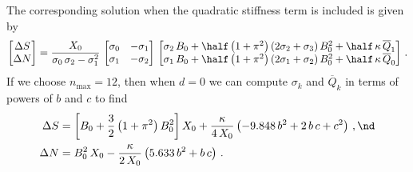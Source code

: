 The corresponding solution when the quadratic stiffness term is included is given by
\begin{equation}\label{eqn:rms_sol_quad}
\begin{bmatrix}
  \Delta S \\
  \Delta N
\end{bmatrix} = \frac{X_0}{\sigma_0\, \sigma_2 - \sigma_1^2}\,
\begin{bmatrix}
  \sigma_0 & -\sigma_1 \\
  \sigma_1 & -\sigma_2
\end{bmatrix}\,
\begin{bmatrix}
  \sigma_2\, B_0 + \half \left(1 + \pi^2\right) \left(2 \sigma_2 + \sigma_3\right) B_0^2 + \half\, \kappa\, \overline{Q}_1 \\
  \sigma_1\, B_0 + \half \left(1 + \pi^2\right) \left(2 \sigma_1 + \sigma_2\right) B_0^2 + \half\, \kappa\, \overline{Q}_0
\end{bmatrix}\, .
 \end{equation}
If we choose $n_\text{max} = 12$, then when $d = 0$ we can compute $\sigma_k$ and $\overline{Q}_k$ in terms of powers of $b$ and $c$ to find
\begin{align} \label{eqn:rms_sol_comp}
  \Delta S &= \left[ B_0 + \frac{3}{2} \left(1 + \pi^2\right) B_0^2 \right] X_0 + \frac{\kappa}{4\, X_0} \left( -9.848\, b^2 + 2\, b\, c + c^2 \right)\, , \nd \\
  \Delta N &= B_0^2\, X_0 - \frac{\kappa}{2\, X_0} \left( 5.633\, b^2 + b\, c \right)\, .
\end{align}

